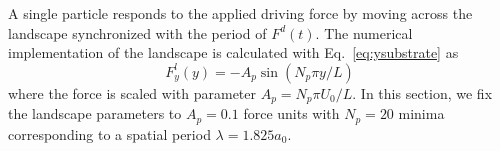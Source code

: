 \documentclass[twocolumn,preprintnumbers,amsmath,amssymb,aps,prx]{revtex4}
\begin{document}
A single particle %
responds to the applied driving force
by moving across the landscape %
synchronized with 
the period of $F^d(t)$.
%
The numerical implementation of the landscape 
is calculated with Eq.~\ref{eq:ysubstrate} as 
\begin{equation}
  \label{eq:force}
  F^l_y(y) = -A_{p} \sin{(N_p \pi y / L)} 
\end{equation}
where the force is scaled with parameter $A_{p} = N_p \pi U_0/L$.
In this section, we fix the landscape parameters
to $A_{p} = 0.1$ force units
with $N_p=20$ minima %
corresponding to a spatial period $\lambda = 1.825 a_0$.
\end{document}
